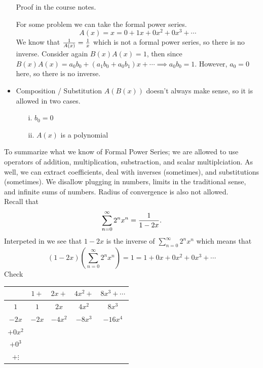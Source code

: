\documentclass[english, 11pt]{article}
\begin{document}
\begin{defn}
\begin{itemize}
   Proof in the course notes.

   \begin{exmp}
     For some problem we can take the formal power series.
     \[ A(x) = x = 0 + 1x + 0x^2 + 0x^3 + \cdots \]
     We know that $\frac{1}{A(x)} = \frac{1}{x}$ which is not a formal power series, so there is no inverse. Consider again $B(x)A(x) = 1$, then since $B(x)A(x) = a_0b_0 + (a_1b_0+a_0b_1)x + \cdots \implies a_0b_0 = 1$. However, $a_0 = 0$ here, so there is no inverse.
   \end{exmp}
   \item Composition / Substitution
   $A(B(x))$ doesn't always make sense, so it is allowed in two cases.
   \begin{itemize}
     \item[i.] $b_0 = 0$
     \item[ii.] $A(x)$ is a polynomial
   \end{itemize}
     \end{itemize}
   \end{defn}

  To summarize what we know of Formal Power Series; we are allowed to use operators of addition, multiplication, substraction, and scalar multiplciation. As well, we can extract coefficients, deal with inverses (sometimes), and substitutions (sometimes). We disallow plugging in numbers, limits in the traditional sense, and infinite sums of numbers. Radius of convergence is also not allowed. \\

  Recall that
  \[ \sum_{n=0}^{\infty} 2^n x^n = \frac{1}{1-2x}. \]
  Interpeted in  we see that $1 - 2x$ is the  inverse of $\sum_{n=0}^{\infty} 2^nx^n$ which means that
  \[ (1-2x)\left( \sum_{n=0}^{\infty} 2^nx^n\right) = 1 = 1 + 0x + 0x^2 + 0x^3 + \cdots \]
  Check \\
   \begin{center}
         \begin{tabular}{c || c | c | c | c}
           {} & $1 +$ & $2x +$ & $4x^2 +$ & $8x^3 + \cdots$ \\
           \hline
           \hline
           $1$ & $1$ & $2x$ & $4x^2$ & $8x^3$ \\
           \hline
           $-2x$ & $-2x$ & $-4x^2$ & $-8x^3$ & $-16x^4$ \\
           \hline
           $+0x^2$ \\
           \hline
           $+0^3$ \\
           \hline
           $+\vdots$
         \end{tabular}
         \end{center}
\end{document}
